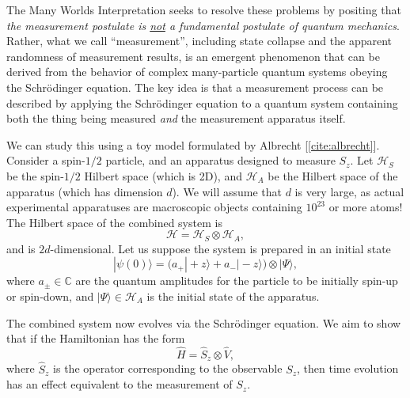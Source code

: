 \documentclass[pra,12pt]{revtex4-2}
\begin{document}
The Many Worlds Interpretation seeks to resolve these problems by
positing that \textit{the measurement postulate is \underline{not} a
  fundamental postulate of quantum mechanics}.  Rather, what we call
``measurement'', including state collapse and the apparent randomness
of measurement results, is an emergent phenomenon that can be derived
from the behavior of complex many-particle quantum systems obeying the
Schr\"odinger equation.  The key idea is that a measurement process
can be described by applying the Schr\"odinger equation to a quantum
system containing both the thing being measured \textit{and} the
measurement apparatus itself.

We can study this using a toy model formulated by Albrecht
[\ref{cite:albrecht}].  Consider a spin-$1/2$ particle, and an
apparatus designed to measure $S_z$.  Let $\mathscr{H}_S$ be the
spin-$1/2$ Hilbert space (which is 2D), and $\mathscr{H}_A$ be the
Hilbert space of the apparatus (which has dimension $d$).  We will
assume that $d$ is very large, as actual experimental apparatuses are
macroscopic objects containing $10^{23}$ or more atoms!  The Hilbert
space of the combined system is
\begin{equation}
  \mathscr{H} = \mathscr{H}_S \otimes \mathscr{H}_A,
\end{equation}
and is $2d$-dimensional.  Let us suppose the system is prepared in an initial
state
\begin{equation}
  |\psi(0)\rangle = \Big(a_+ |\!+z\rangle + a_- |\!-z\rangle\Big) \otimes |\Psi\rangle,
\end{equation}
where $a_\pm\in\mathbb{C}$ are the quantum amplitudes for the particle
to be initially spin-up or spin-down, and $|\Psi\rangle \in
\mathscr{H}_A$ is the initial state of the apparatus.

The combined system now evolves via the Schr\"odinger equation.  We
aim to show that if the Hamiltonian has the form
\begin{equation}
  \hat{H} = \hat{S}_z \otimes \hat{V},
\end{equation}
where $\hat{S}_z$ is the operator corresponding to the observable
$S_z$, then time evolution has an effect equivalent to the measurement
of $S_z$.
\end{document}
